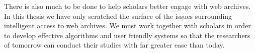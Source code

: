 There is also much to be done to help scholars better engage with web archives. In this thesis we have only scratched the surface of the issues surrounding intelligent access to web archives. We must work together with scholars in order to develop effective algorithms and user friendly systems so that the researchers of tomorrow can conduct their studies with far greater ease than today.


